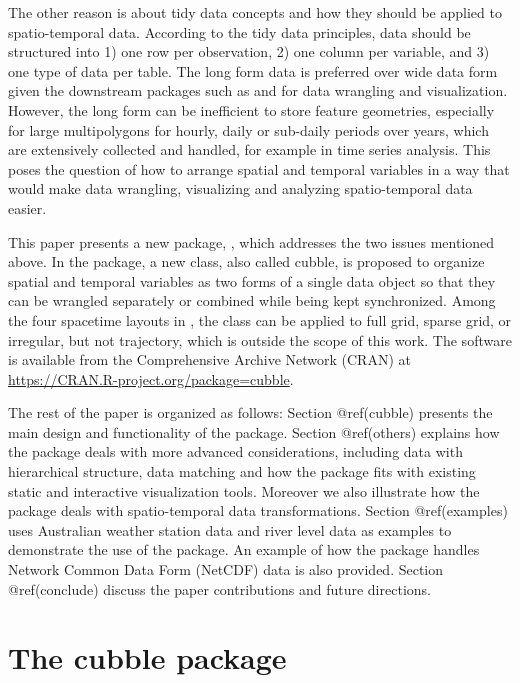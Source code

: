 \documentclass[
]{jss}
\begin{document}
The other reason is about tidy data concepts \citep{tidydata} and how
they should be applied to spatio-temporal data. According to the tidy
data principles, data should be structured into 1) one row per
observation, 2) one column per variable, and 3) one type of data per
table. The long form data is preferred over wide data form given the
downstream packages such as  \citep{dplyr} and 
\citep{ggplot2} for data wrangling and visualization. However, the long
form can be inefficient to store feature geometries, especially for
large multipolygons for hourly, daily or sub-daily periods over years,
which are extensively collected and handled, for example in time series
analysis. This poses the question of how to arrange spatial and temporal
variables in a way that would make data wrangling, visualizing and
analyzing spatio-temporal data easier.

This paper presents a new  package, , which
addresses the two issues mentioned above. In the package, a new class,
also called cubble, is proposed to organize spatial and temporal
variables as two forms of a single data object so that they can be
wrangled separately or combined while being kept synchronized. Among the
four spacetime layouts in \citet{spacetime}, the  class can
be applied to full grid, sparse grid, or irregular, but not trajectory,
which is outside the scope of this work. The software is available from
the Comprehensive  Archive Network (CRAN) at
\url{https://CRAN.R-project.org/package=cubble}.

The rest of the paper is organized as follows: Section @ref(cubble)
presents the main design and functionality of the  package.
Section @ref(others) explains how the  package deals with
more advanced considerations, including data with hierarchical
structure, data matching and how the package fits with existing static
and interactive visualization tools. Moreover we also illustrate how the
 package deals with spatio-temporal data transformations.
Section @ref(examples) uses Australian weather station data and river
level data as examples to demonstrate the use of the package. An example
of how the  package handles Network Common Data Form
(NetCDF) data is also provided. Section @ref(conclude) discuss the paper
contributions and future directions.

\hypertarget{cubble}{%
\section{The cubble package}\label{cubble}}
\end{document}
